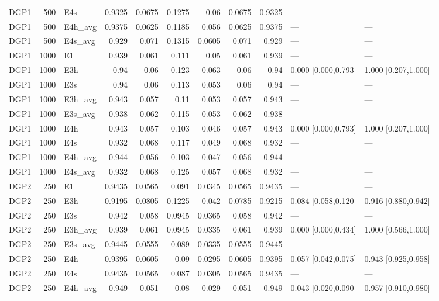 \begin{table}[!htbp]
{\begin{tabular}{lrlrrrrrrll}
DGP1 & 500 & E4s & 0.9325 & 0.0675 & 0.1275 & 0.06 & 0.0675 & 0.9325 & --- & --- \\
DGP1 & 500 & E4h_avg & 0.9375 & 0.0625 & 0.1185 & 0.056 & 0.0625 & 0.9375 & --- & --- \\
DGP1 & 500 & E4s_avg & 0.929 & 0.071 & 0.1315 & 0.0605 & 0.071 & 0.929 & --- & --- \\
DGP1 & 1000 & E1 & 0.939 & 0.061 & 0.111 & 0.05 & 0.061 & 0.939 & --- & --- \\
DGP1 & 1000 & E3h & 0.94 & 0.06 & 0.123 & 0.063 & 0.06 & 0.94 & 0.000 [0.000,0.793] & 1.000 [0.207,1.000] \\
DGP1 & 1000 & E3s & 0.94 & 0.06 & 0.113 & 0.053 & 0.06 & 0.94 & --- & --- \\
DGP1 & 1000 & E3h_avg & 0.943 & 0.057 & 0.11 & 0.053 & 0.057 & 0.943 & --- & --- \\
DGP1 & 1000 & E3s_avg & 0.938 & 0.062 & 0.115 & 0.053 & 0.062 & 0.938 & --- & --- \\
DGP1 & 1000 & E4h & 0.943 & 0.057 & 0.103 & 0.046 & 0.057 & 0.943 & 0.000 [0.000,0.793] & 1.000 [0.207,1.000] \\
DGP1 & 1000 & E4s & 0.932 & 0.068 & 0.117 & 0.049 & 0.068 & 0.932 & --- & --- \\
DGP1 & 1000 & E4h_avg & 0.944 & 0.056 & 0.103 & 0.047 & 0.056 & 0.944 & --- & --- \\
DGP1 & 1000 & E4s_avg & 0.932 & 0.068 & 0.125 & 0.057 & 0.068 & 0.932 & --- & --- \\
DGP2 & 250 & E1 & 0.9435 & 0.0565 & 0.091 & 0.0345 & 0.0565 & 0.9435 & --- & --- \\
DGP2 & 250 & E3h & 0.9195 & 0.0805 & 0.1225 & 0.042 & 0.0785 & 0.9215 & 0.084 [0.058,0.120] & 0.916 [0.880,0.942] \\
DGP2 & 250 & E3s & 0.942 & 0.058 & 0.0945 & 0.0365 & 0.058 & 0.942 & --- & --- \\
DGP2 & 250 & E3h_avg & 0.939 & 0.061 & 0.0945 & 0.0335 & 0.061 & 0.939 & 0.000 [0.000,0.434] & 1.000 [0.566,1.000] \\
DGP2 & 250 & E3s_avg & 0.9445 & 0.0555 & 0.089 & 0.0335 & 0.0555 & 0.9445 & --- & --- \\
DGP2 & 250 & E4h & 0.9395 & 0.0605 & 0.09 & 0.0295 & 0.0605 & 0.9395 & 0.057 [0.042,0.075] & 0.943 [0.925,0.958] \\
DGP2 & 250 & E4s & 0.9435 & 0.0565 & 0.087 & 0.0305 & 0.0565 & 0.9435 & --- & --- \\
DGP2 & 250 & E4h_avg & 0.949 & 0.051 & 0.08 & 0.029 & 0.051 & 0.949 & 0.043 [0.020,0.090] & 0.957 [0.910,0.980] \\

\end{tabular}}
\end{table}
